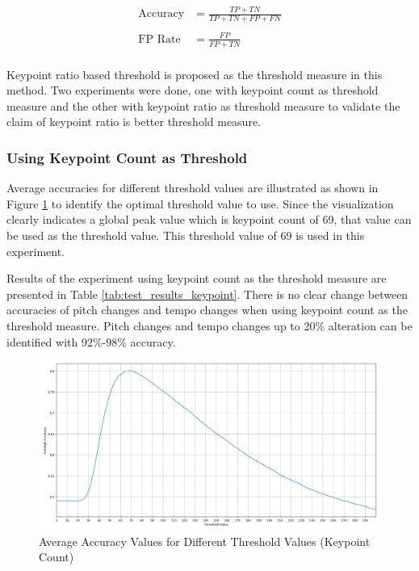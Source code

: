 \begin{align*}
    \text{Accuracy} &= \frac{TP+TN}{TP+TN+FP+FN}\\
    \\
    \text{FP Rate} &= \frac{FP}{FP+TN}\\
\end{align*}

Keypoint ratio based threshold is proposed as the threshold measure in this method. Two experiments were done, one with keypoint count as threshold measure and the
other with keypoint ratio as threshold measure to validate the claim of keypoint ratio is better threshold measure. 

\subsubsection{Using Keypoint Count as Threshold}

Average accuracies for different threshold values are illustrated as shown in Figure \ref{fig:threshold_old} to identify the optimal threshold value to use. Since
the visualization clearly indicates a global peak value which is keypoint count of 69, that value can be used as the threshold value. This threshold value of 69 is
used in this experiment. 
\vspace{12pt}

Results of the experiment using keypoint count as the threshold measure are presented in Table \ref{tab:test_results_keypoint}. There is no clear
change between accuracies of pitch changes and tempo changes when using keypoint count as the threshold measure. Pitch changes and tempo changes
up to 20\% alteration can be identified with 92\%-98\% accuracy. 


\begin{figure}[h]
    \centering
    \includegraphics[scale=0.21]{images/threshold_adjusting_old.png}
    \caption{Average Accuracy Values for Different Threshold Values (Keypoint Count)}
    \label{fig:threshold_old}
  \end{figure}
  



